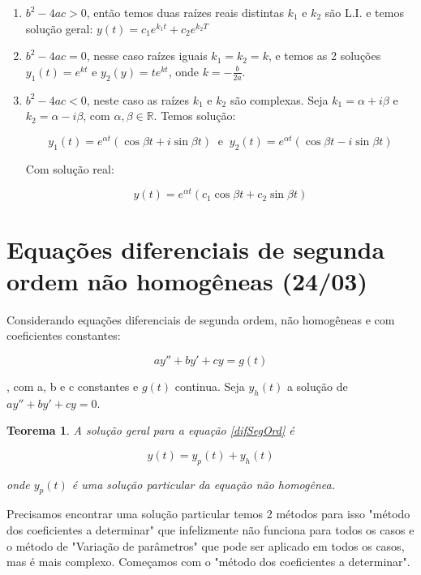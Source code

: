 \documentclass[12pt]{article}
\newtheorem{theorem}{Teorema}[section]
\begin{document}
\begin{enumerate}
    \item $b^2 - 4 a c > 0$, então temos duas raízes reais distintas $k_1$ e $k_2$ são L.I. e temos solução geral: $y(t) = c_1 e^{k_1 t} + c_2 e^{k_2 T}$
    \item $b^2 - 4 a c = 0$, nesse caso raízes iguais $k_1 = k_2 = k$, e temos as 2 soluções $y_1(t) = e^{k t}$ e $y_2(y) = t e^{k t}$, onde $k = - \frac{b}{2 a}$.
    \item $b^2 - 4 a c < 0$, neste caso as raízes $k_1$ e $k_2$ são complexas. Seja $k_1 = \alpha + i \beta$ e $k_2 = \alpha - i \beta$, com $\alpha, \beta \in \mathbb{R}$. Temos solução:
    
    $$y_1(t) = e^{\alpha t} (\cos \beta t +  i\sin \beta t) \ \text{ e } \ y_2(t) = e^{\alpha t} (\cos \beta t -  i\sin \beta t)$$
    
    Com solução real:
    
    $$y(t) = e^{\alpha t} (c_1 \cos \beta t + c_2 \sin \beta t)$$
\end{enumerate}

\section{Equações diferenciais de segunda ordem não homogêneas (24/03)}

Considerando equações diferenciais de segunda ordem, não homogêneas e com coeficientes constantes: 

\begin{equation}\label{difSegOrd}
ay'' + b y' + c y = g(t)
\end{equation}

, com a, b e c constantes e $g(t)$ continua. Seja $y_h(t)$ a solução de $ay'' + b y' + c y = 0$.

\begin{theorem}
    A solução geral para a equação \ref{difSegOrd} é 
    
    $$y(t) = y_p (t) + y_h (t)$$
    
    onde $y_p(t)$ é uma solução particular da equação não homogênea.
\end{theorem}

Precisamos encontrar uma solução particular temos 2 métodos para isso "método dos coeficientes a determinar" que infelizmente não funciona para todos os casos e o método de "Variação de parâmetros" que pode ser aplicado em todos os casos, mas é mais complexo. Começamos com o "método dos coeficientes a determinar".
\end{document}
